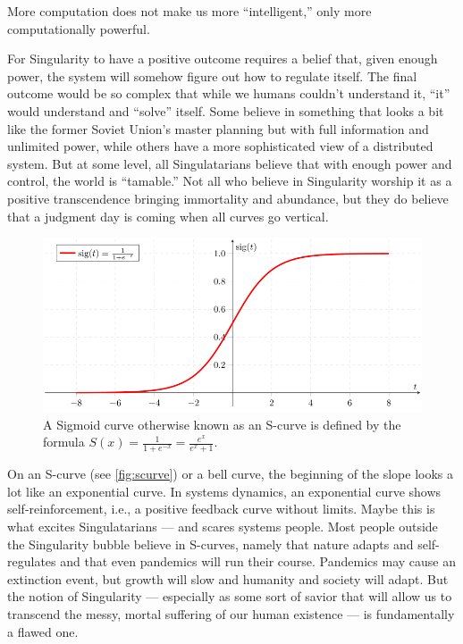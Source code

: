 More computation does not make us more ``intelligent,'' only more computationally powerful.

For Singularity to have a positive outcome requires a belief that, given enough power, the system will somehow figure out how to regulate itself. The final outcome would be so complex that while we humans couldn't understand it, ``it'' would understand and ``solve'' itself. Some believe in something that looks a bit like the former Soviet Union's master planning but with full information and unlimited power, while others have a more sophisticated view of a distributed system. But at some level, all Singulatarians believe that with enough power and control, the world is ``tamable.'' Not all who believe in Singularity worship it as a positive transcendence bringing immortality and abundance, but they do believe that a judgment day is coming when all curves go vertical.

\begin{figure}[h]
 \centering
 \includegraphics[width=1\textwidth]{pictures/Sigmoid-function}
 \caption{A Sigmoid curve otherwise known as an S-curve is defined by the formula $S(x) = \frac{1}{1 + e^{-x}} = \frac{e^{x}}{e^{x} + 1}$.}
 \label{fig:scurve}
\end{figure}

On an S-curve (see \autoref{fig:scurve}) or a bell curve, the beginning of the slope looks a lot like an exponential curve. In systems dynamics, an exponential curve shows self-reinforcement, i.e., a positive feedback curve without limits. Maybe this is what excites Singulatarians --- and scares systems people. Most people outside the Singularity bubble believe in S-curves, namely that nature adapts and self-regulates and that even pandemics will run their course. Pandemics may cause an extinction event, but growth will slow and humanity and society will adapt. But the notion of Singularity --- especially as some sort of savior  that will allow us to transcend the messy, mortal suffering of our human existence --- is fundamentally a flawed one.

